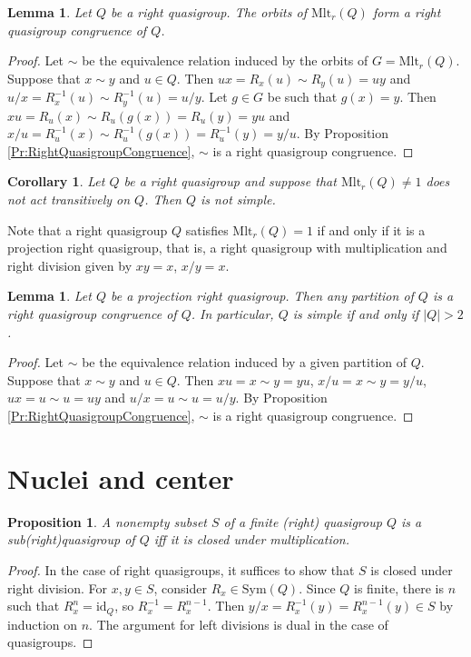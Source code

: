 \documentclass{amsart}
\def\rdiv{/}
\def\rmlt#1{\mathrm{Mlt}_r(#1)}
\theoremstyle{plain}
\newtheorem{corollary}[theorem]{Corollary}
\newtheorem{lemma}[theorem]{Lemma}
\newtheorem{proposition}[theorem]{Proposition}
\theoremstyle{definition}
\begin{document}
\begin{lemma}
Let $Q$ be a right quasigroup. The orbits of $\rmlt{Q}$ form a right quasigroup congruence of $Q$.
\end{lemma}
\begin{proof}
Let $\sim$ be the equivalence relation induced by the orbits of $G=\rmlt{Q}$. Suppose that $x\sim y$ and $u\in Q$. Then $ux = R_x(u)\sim R_y(u) = uy$ and $u/x = R_x^{-1}(u)\sim R_y^{-1}(u) = u/y$. Let $g\in G$ be such that $g(x)=y$. Then $xu = R_u(x)\sim R_u(g(x)) = R_u(y) = yu$ and $x/u = R_u^{-1}(x)\sim R_u^{-1}(g(x)) = R_u^{-1}(y) = y/u$. By Proposition \ref{Pr:RightQuasigroupCongruence}, $\sim$ is a right quasigroup congruence.
\end{proof}

\begin{corollary}
Let $Q$ be a right quasigroup and suppose that $\rmlt{Q}\ne 1$ does not act transitively on $Q$. Then $Q$ is not simple.
\end{corollary}

Note that a right quasigroup $Q$ satisfies $\rmlt{Q}=1$ if and only if it is a projection right quasigroup, that is, a right quasigroup with multiplication and right division given by $xy=x$, $x/y=x$.

\begin{lemma}
Let $Q$ be a projection right quasigroup. Then any partition of $Q$ is a right quasigroup congruence of $Q$. In particular, $Q$ is simple if and only if $|Q|>2$.
\end{lemma}
\begin{proof}
Let $\sim$ be the equivalence relation induced by a given partition of $Q$. Suppose that $x\sim y$ and $u\in Q$. Then $xu = x\sim y = yu$, $x/u = x\sim y = y/u$, $ux = u\sim u = uy$ and $u/x = u\sim u = u/y$. By Proposition \ref{Pr:RightQuasigroupCongruence}, $\sim$ is a right quasigroup congruence.
\end{proof}

\section{Nuclei and center}

\begin{proposition}\label{Pr:Sub}
A nonempty subset $S$ of a finite (right) quasigroup $Q$ is a sub(right)quasigroup of $Q$ iff it is closed under multiplication.
\end{proposition}
\begin{proof}
In the case of right quasigroups, it suffices to show that $S$ is closed under right division. For $x,y\in S$, consider $R_x\in\mathrm{Sym}(Q)$. Since $Q$ is finite, there is $n$ such that $R_x^n=\mathrm{id}_Q$, so $R_x^{-1} = R_x^{n-1}$. Then $y\rdiv x = R_x^{-1}(y) = R_x^{n-1}(y)\in S$ by induction on $n$. The argument for left divisions is dual in the case of quasigroups.
\end{proof}
\end{document}
